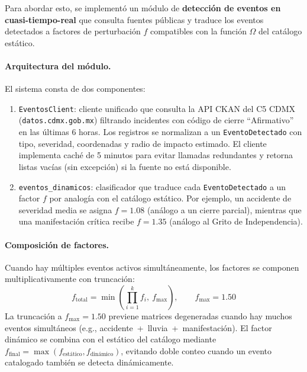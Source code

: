 \documentclass[11pt,a4paper]{article}
\begin{document}
Para abordar esto, se implementó un módulo de \textbf{detección de eventos en cuasi-tiempo-real} que consulta fuentes públicas y traduce los eventos detectados a factores de perturbación $f$ compatibles con la función $\Omega$ del catálogo estático.

\paragraph{Arquitectura del módulo.}
El sistema consta de dos componentes:

\begin{enumerate}[leftmargin=*]
\item \texttt{EventosClient}: cliente unificado que consulta la API CKAN del C5 CDMX (\texttt{datos.cdmx.gob.mx}) filtrando incidentes con código de cierre ``Afirmativo'' en las últimas 6 horas. Los registros se normalizan a un \texttt{EventoDetectado} con tipo, severidad, coordenadas y radio de impacto estimado. El cliente implementa caché de 5 minutos para evitar llamadas redundantes y retorna listas vacías (sin excepción) si la fuente no está disponible.

\item \texttt{eventos\_dinamicos}: clasificador que traduce cada \texttt{EventoDetectado} a un factor $f$ por analogía con el catálogo estático. Por ejemplo, un accidente de severidad media se asigna $f = 1.08$ (análogo a un cierre parcial), mientras que una manifestación crítica recibe $f = 1.35$ (análogo al Grito de Independencia).
\end{enumerate}

\paragraph{Composición de factores.}
Cuando hay múltiples eventos activos simultáneamente, los factores se componen multiplicativamente con truncación:
\begin{equation}
f_{\text{total}} = \min\!\left(\prod_{i=1}^{k} f_i,\ f_{\max}\right), \qquad f_{\max} = 1.50
\label{eq:composicion_factores}
\end{equation}
La truncación a $f_{\max} = 1.50$ previene matrices degeneradas cuando hay muchos eventos simultáneos (e.g., accidente~+~lluvia~+~manifestación). El factor dinámico se combina con el estático del catálogo mediante $f_{\text{final}} = \max(f_{\text{estático}}, f_{\text{dinámico}})$, evitando doble conteo cuando un evento catalogado también se detecta dinámicamente.
\end{document}
